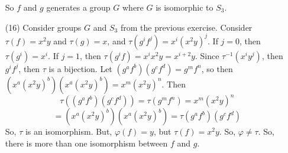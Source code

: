 \documentclass[12pt]{article}
\begin{document}
\begin{itemize}
So $f$ and $g$ generates a group $G$ where $G$ is isomorphic to $S_3$.
\item[(16)]
Consider groups $G$ and $S_3$ from the previous exercise. Consider $\tau(f) = x^2y$ and $\tau(g) = x$, and $\tau(g^if^j) = x^i(x^2y)^j$. If $j = 0$, then $\tau(g^i) = x^i$. If $j = 1$, then $\tau(g^if) = x^ix^2y = x^{i+2}y$. Since $\tau^{-1}(x^iy^j)$, then $g^if^j$, then $\tau$ is a bijection. Let $(g^af^b)(g^cf^d) = g^mf^n$, so then $(x^a(x^2y)^b)(x^a(x^2y)^b) = x^m(x^2y)^n$. Then
$$\tau((g^af^b)(g^cf^d)) = \tau(g^mf^n) = x^m(x^2y)^n$$
$$= (x^a(x^2y)^b)(x^a(x^2y)^b) = \tau(g^af^b)(g^cf^d)$$
So, $\tau$ is an isomorphism. But, $\varphi(f) = y$, but $\tau(f) = x^2y$. So, $\varphi \neq \tau$. So, there is more than one isomorphism between $f$ and $g$.
\end{itemize}
\end{document}
